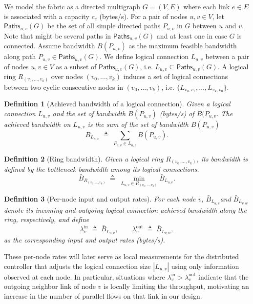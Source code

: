\documentclass[12pt]{article}
\newtheorem{definition}{Definition}
\begin{document}
We model the fabric as a directed multigraph $G=(V,E)$ where each link $e \in E$ is associated with a capacity $c_e$ (bytes/s).
For a pair of nodes $u,v\in V$, let $\mathsf{Paths}_{u,v}(G)$ be the set of all simple directed paths $P_{u,v}$ in $G$ between $u$ and $v$. Note that might be several paths in $\mathsf{Paths}_{u,v}(G)$ and at least one in case $G$ is connected. 
Assume  bandwidth $B(P_{u,v})$ as the maximum feasible bandwidth along path $P_{u,v} \in \mathsf{Paths}_{u,v}(G)$.
We define logical connection $L_{u,v}$ between a pair of nodes  $u,v\in V$ as a subset of $\mathsf{Paths}_{u,v}(G)$, i.e. $L_{u,v} \subseteq \mathsf{Paths}_{u,v}(G)$. 
A logical ring $R_(v_0,\dots,v_k)$ over nodes $(v_0,\dots,v_k)$ induces a set of logical connections between two cyclic consecutive nodes in $(v_0,\dots,v_k)$, i.e.  $\{L_{v_0,v_1},\dots,L_{v_k,v_0}\}$.



\begin{definition}[Achieved bandwidth of a logical connection]
Given a logical connection $L_{u,v}$ and the set of bandwidth $B(P_{u,v})$ (bytes/s) of $B(P_{u,v}$.
The achieved bandwidth on $L_{u,v}$ is the sum of the set of bandwidth $B(P_{u,v})$ 
\[
\bar{B}_{L_{u,v}} \;\triangleq\; \sum_{P_{u,v}\in L_{u,v} } B(P_{u,v}).
\]
\end{definition}


\begin{definition}[Ring bandwidth]
Given a logical ring $R_(v_0,\dots,v_k)$, its bandwidth is defined by the bottleneck bandwidth among its logical connections.
\[
\bar{B}_{R_(v_0,\dots,v_k)} \;\triangleq\; \min_{L_{u,v} \in R_(v_0,\dots,v_k)} \bar{B}_{L_{u,v}}.
\]
\end{definition}



\begin{definition}[Per-node input and output rates]
For each node $v$, $\bar{B}_{L_{u,v}}$and $\bar{B}_{L_{v,w}}$
denote its incoming and outgoing logical connection achieved bandwidth along the ring, respectively, and define
\[
\lambda_v^{\mathrm{in}} \;\triangleq\;
\bar{B}_{L_{u,v}},
\qquad
\lambda_v^{\mathrm{out}} \;\triangleq\;
\bar{B}_{L_{v,w}},
\]
as the corresponding input and output rates (bytes/s).
\end{definition}

These per-node rates will later serve as local measurements for the distributed controller that adjusts the logical connection size $|L_{u,v}|$ using only information observed at each node.
In particular, situations where $\lambda_v^{\mathrm{in}} > \lambda_v^{\mathrm{out}}$ indicate that the outgoing neighbor link of node $v$ is locally limiting the throughput, motivating an increase in the number of parallel flows on that link in our design.
\end{document}
